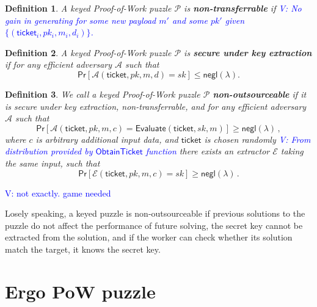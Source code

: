 \documentclass[]{article}
\newcommand{\vk}[1]{\textcolor{blue}{V: {#1}}}
\newcommand{\Ticket}{\mathsf{ticket}}
\newcommand{\Eval}{\mathsf{Evaluate}}
\newcommand{\ObtainTicket}{\mathsf{ObtainTicket}}
\newtheorem{definition}{Definition}
\begin{document}
    \begin{definition}
        A keyed Proof-of-Work puzzle $\mathcal{P}$ is {\bf non-transferrable} if
        \vk{No gain in generating for some new payload $m'$ and some $pk'$ given
        $\{(\Ticket_i, pk_i, m_i, d_i)\}$.}
    \end{definition}

    \begin{definition}
        A keyed Proof-of-Work puzzle $\mathcal{P}$ is {\bf secure under key
        extraction} if for any efficient adversary $\mathcal{A}$ such that
        \begin{equation}
            \mathsf{Pr}[\mathcal{A}(\Ticket,pk,m,d)=sk]\le\mathsf{negl}(\lambda).
        \end{equation}
    \end{definition}

    \begin{definition}
        We call a keyed Proof-of-Work puzzle $\mathcal{P}$ {\bf non-outsourceable} if
        it is secure under key extraction, non-transferrable, and for any efficient adversary
        $\mathcal{A}$ such that 
        \begin{equation}
            \mathsf{Pr}[\mathcal{A}(\Ticket, pk, m, c)=\Eval(\Ticket, sk, m)]\ge
            \mathsf{negl}(\lambda)\,,
        \end{equation}
        where $c$ is arbitrary additional input data, and $\Ticket$ is chosen
        randomly \vk{From distribution provided by $\ObtainTicket$ function}
        there exists an extractor $\mathcal{E}$ taking the same input, such that
        \begin{equation}
            \mathsf{Pr}[\mathcal{E}(\Ticket,pk,m,c)=sk]\ge
            \mathsf{negl}(\lambda)\,.
        \end{equation}
    \end{definition}
    \vk{not exactly. game needed}

    Losely speaking, a keyed puzzle is non-outsourceable if previous solutions to
    the puzzle do not affect the performance of future solving, the secret key
    cannot be extracted from the solution, and if the worker can check whether
    its solution match the target, it knows the secret key.

    \section{Ergo PoW puzzle}
    \label{puzzle}
\end{document}
